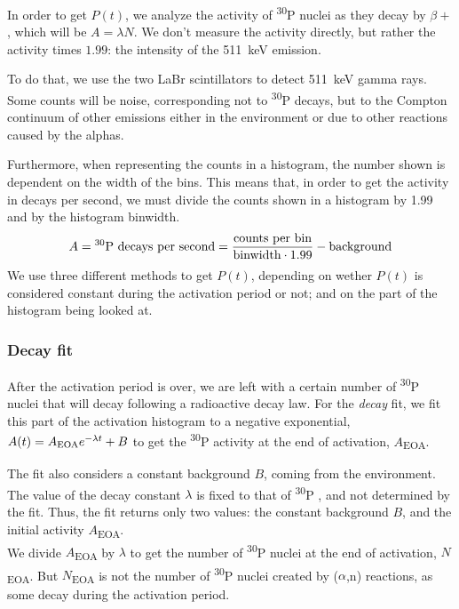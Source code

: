 \documentclass[a4paper,12pt]{report}
\newcommand{\an}{($\alpha$,n) }
\newcommand{\Piso}{\textsuperscript{30}P }
\begin{document}
In order to get $P(t)$, we analyze the activity of \Piso nuclei as they decay by $\beta +$, which will be $A = \lambda N$.
We don't measure the activity directly, but rather the activity times $1.99$: the intensity of the \qty{511}{\keV} emission.	%

To do that, we use the two LaBr scintillators to detect \qty{511}{\keV} gamma rays.
Some counts will be noise, corresponding not to \Piso decays, but to the Compton continuum of other emissions either in the environment or due to other reactions caused by the alphas.

Furthermore, when representing the counts in a histogram, the number shown is dependent on the width of the bins.
This means that, in order to get the activity in decays per second, we must divide the counts shown in a histogram by 1.99 and by the histogram binwidth.
\begin{equation}
	A = \text{\Piso decays per second} = \frac{\text{counts per bin}}{\text{binwidth}\cdot\num{1.99}} - \text{background}
\end{equation}
We use three different methods to get $P(t)$, depending on wether $P(t)$ is considered constant during the activation period or not; and on the part of the histogram being looked at.

\subsubsection{Decay fit}
After the activation period is over, we are left with a certain number of \Piso nuclei that will decay following a radioactive decay law.
For the \textit{decay} fit, we fit this part of the activation histogram to a negative exponential, $A(t) = A\textsubscript{EOA} e^{-\lambda t} + B$ to get the \Piso activity at the end of activation, $A$\textsubscript{EOA}.

The fit also considers a constant background $B$, coming from the environment.
The value of the decay constant $\lambda$ is fixed to that of \Piso, and not determined by the fit.
Thus, the fit returns only two values: the constant background $B$, and the initial activity $A$\textsubscript{EOA}.
\\

We divide $A$\textsubscript{EOA} by $\lambda$ to get the number of \Piso nuclei at the end of activation, $N$\textsubscript{EOA}.
But $N$\textsubscript{EOA} is not the number of \Piso nuclei created by \an reactions, as some decay during the activation period.
\end{document}
